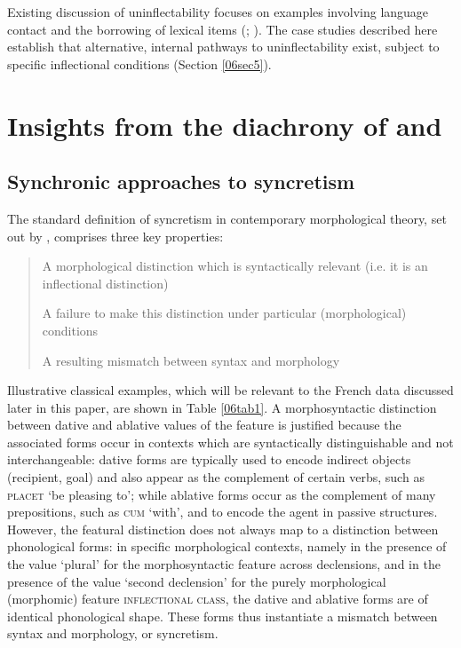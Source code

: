 \documentclass[output=paper,colorlinks,citecolor=brown]{langscibook}
\begin{document}
Existing discussion of uninflectability focuses on examples involving language contact and the borrowing of lexical items (\citealt[33]{baermanbrowncorbett2005}; \citealt{spencer2020}). The case studies described here establish that alternative, internal pathways to uninflectability exist, subject to specific inflectional conditions (Section \ref{06sec5}).

\section{Insights from the diachrony of  and } \label{06sec2}

\subsection{Synchronic approaches to syncretism} \label{06sec2.1}

The standard definition of syncretism in contemporary morphological theory, set out by \citet{baermanbrowncorbett2005}, comprises three key properties:

\begin{quote}
	A morphological distinction which is syntactically relevant (i.e. it is an inflectional distinction)
	
	A failure to make this distinction under particular (morphological) conditions
	
	A resulting mismatch between syntax and morphology \citep[2]{baermanbrowncorbett2005}
\end{quote}

Illustrative classical  examples, which will be relevant to the French data discussed later in this paper, are shown in Table \ref{06tab1}. A morphosyntactic distinction between dative and ablative values of the feature \textsc{} is justified because the associated forms occur in contexts which are syntactically distinguishable and not interchangeable: dative forms are typically used to encode indirect objects (recipient, goal) and also appear as the complement of certain verbs, such as \textsc{placet} `be pleasing to'; while ablative forms occur as the complement of many prepositions, such as \textsc{cum} `with', and to encode the agent in passive structures. However, the featural distinction does not always map to a distinction between phonological forms: in specific morphological contexts, namely in the presence of the value `plural' for the morphosyntactic feature \textsc{} across declensions, and in the presence of the value `second declension' for the purely morphological (morphomic) feature \textsc{inflectional class}, the dative and ablative forms are of identical phonological shape. These forms thus instantiate a mismatch between syntax and morphology, or syncretism.
\end{document}
